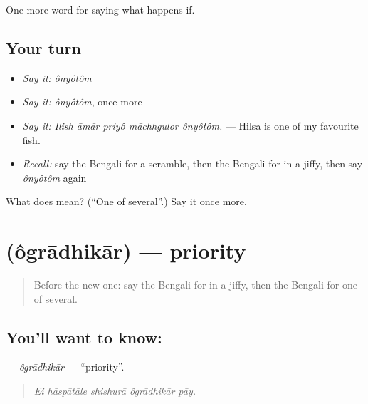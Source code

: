 \begin{grammarlens}[title={What you've built}]
One more word for saying what happens if.
\end{grammarlens}

\subsection*{Your turn}
\begin{itemize}
\raggedright
  \item \emph{Say it:} \emph{ônyôtôm}
  \item \emph{Say it:} \emph{ônyôtôm}, once more
  \item \emph{Say it:} \emph{Ilish āmār priyô māchhgulor ônyôtôm.} — Hilsa is one of my favourite fish.
  \item \emph{Recall:} say the Bengali for a scramble, then the Bengali for in a jiffy, then say \emph{ônyôtôm} again
\end{itemize}

\begin{tcolorbox}[breakable,colback=teal!4,colframe=teal!35!black,title={Before you move on}]
What does  mean? (\textquotedblleft{}One of several\textquotedblright{}.) Say it once more.
\end{tcolorbox}
\section[\texorpdfstring{\bn{অগ্রাধিকার} (ôgrādhikār)}{অগ্রাধিকার (ôgrādhikār)}]{ (ôgrādhikār) — priority}

\label{lesson:BN-C545-ogradhikar}



\begin{quote}
Before the new one: say the Bengali for in a jiffy, then the Bengali for one of several.
\end{quote}

\subsection*{You'll want to know: }
\textbf{} — \emph{ôgrādhikār} — \textquotedblleft{}priority\textquotedblright{}.

\begin{quote}
    
\end{quote}

\begin{quote}
\emph{Ei hāspātāle shishurā ôgrādhikār pāy.}
\end{quote}

